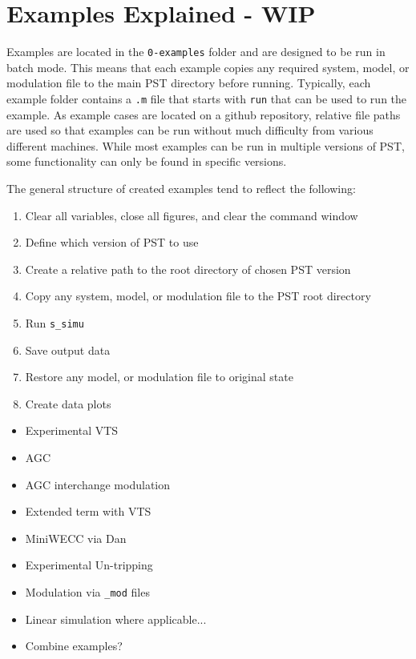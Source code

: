 \chapter{Examples Explained - WIP}
Examples are located in the \verb|0-examples| folder and are designed to be run in batch mode.
This means that each example copies any required system, model, or modulation file to the main PST directory before running.
Typically, each example folder contains a \verb|.m| file that starts with \verb|run| that can be used to run the example.
As example cases are located on a github repository, relative file paths are used so that examples can be run without much difficulty from various different machines.
While most examples can be run in multiple versions of PST, some functionality can only be found in specific versions.

\noindent The general structure of created examples tend to reflect the following:
\begin{enumerate}
\itemsep 0em
\item Clear all variables, close all figures, and clear the command window
\item Define which version of PST to use
\item Create a relative path to the root directory of chosen PST version
\item Copy any system, model, or modulation file to the PST root directory
\item Run \verb|s_simu|
\item Save output data
\item Restore any model, or modulation file to original state
\item Create data plots
\end{enumerate}



\pagebreak
\begin{itemize}
\item Experimental VTS
\item AGC
\item AGC interchange modulation
\item Extended term with VTS
\item MiniWECC via Dan
\item Experimental Un-tripping
\item Modulation via \verb|_mod| files
\item Linear simulation where applicable...
\item Combine examples? 
\end{itemize}


